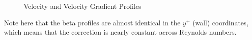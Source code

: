 \documentclass{article}
\begin{document}
\begin{figure}[H]

\caption{Velocity and Velocity Gradient Profiles}                                                                                       %
\label{vel2}                                                                                                     %
\end{figure}                                                                                                      %
Note here that the beta profiles are almost identical in the $y^+$ (wall) coordinates, which means that the correction
is nearly constant across Reynolds numbers.
\end{document}
